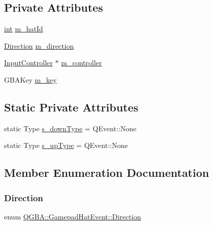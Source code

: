 \subsection*{Private Attributes}
\begin{DoxyCompactItemize}
\item 
\mbox{\hyperlink{ioapi_8h_a787fa3cf048117ba7123753c1e74fcd6}{int}} \mbox{\hyperlink{class_q_g_b_a_1_1_gamepad_hat_event_aea4b197843fa2dd934c12f4e89d21ba8}{m\+\_\+hat\+Id}}
\item 
\mbox{\hyperlink{class_q_g_b_a_1_1_gamepad_hat_event_ae3f20662c61b054e5344aafb9d843837}{Direction}} \mbox{\hyperlink{class_q_g_b_a_1_1_gamepad_hat_event_a878e65eecba7df468daa744115fa09f3}{m\+\_\+direction}}
\item 
\mbox{\hyperlink{class_q_g_b_a_1_1_input_controller}{Input\+Controller}} $\ast$ \mbox{\hyperlink{class_q_g_b_a_1_1_gamepad_hat_event_aeb6ae14151d609c2d89d984326af3bf4}{m\+\_\+controller}}
\item 
G\+B\+A\+Key \mbox{\hyperlink{class_q_g_b_a_1_1_gamepad_hat_event_a4b59d987007773853ec8f856813889e0}{m\+\_\+key}}
\end{DoxyCompactItemize}
\subsection*{Static Private Attributes}
\begin{DoxyCompactItemize}
\item 
static Type \mbox{\hyperlink{class_q_g_b_a_1_1_gamepad_hat_event_a213bfd45dfebf9e30063e6e280af96a6}{s\+\_\+down\+Type}} = Q\+Event\+::\+None
\item 
static Type \mbox{\hyperlink{class_q_g_b_a_1_1_gamepad_hat_event_ab86279c6ad98b49f263999c53189ccae}{s\+\_\+up\+Type}} = Q\+Event\+::\+None
\end{DoxyCompactItemize}


\subsection{Member Enumeration Documentation}
\mbox{\label{class_q_g_b_a_1_1_gamepad_hat_event_ae3f20662c61b054e5344aafb9d843837}} 
\subsubsection{\texorpdfstring{Direction}{Direction}}
{\footnotesize\ttfamily enum \mbox{\hyperlink{class_q_g_b_a_1_1_gamepad_hat_event_ae3f20662c61b054e5344aafb9d843837}{Q\+G\+B\+A\+::\+Gamepad\+Hat\+Event\+::\+Direction}}}

